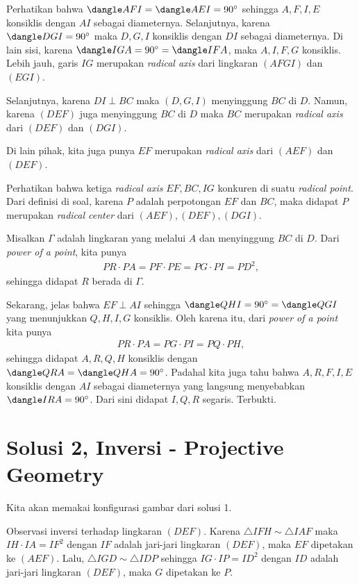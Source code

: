     Perhatikan bahwa $\dangle AFI = \dangle AEI = 90^\circ$ sehingga $A,F,I,E$ konsiklis dengan $AI$ sebagai diameternya. 
    Selanjutnya, karena $\dangle DGI = 90^\circ$ maka $D,G,I$ konsiklis dengan $DI$ sebagai diameternya. Di lain sisi, karena $\dangle IGA = 90^\circ = \dangle IFA$, maka $A,I,F,G$ konsiklis. 
    Lebih jauh, garis $IG$ merupakan \textit{radical axis} dari lingkaran $(AFGI)$ dan $(EGI)$.
    
    Selanjutnya, karena $DI \perp BC$ maka $(D,G,I)$ menyinggung $BC$ di $D$. Namun, karena $(DEF)$ juga menyinggung $BC$ di $D$ maka $BC$ merupakan \textit{radical axis} dari $(DEF)$ dan $(DGI)$.

    Di lain pihak, kita juga punya $EF$ merupakan \textit{radical axis} dari $(AEF)$ dan $(DEF)$.

    Perhatikan bahwa ketiga \textit{radical axis} $EF, BC, IG$ konkuren di suatu \textit{radical point}. Dari definisi di soal, karena $P$ adalah perpotongan $EF$ dan $BC$, maka didapat $P$ merupakan \textit{radical center} dari $(AEF), (DEF), (DGI)$.

    Misalkan $\Gamma$ adalah lingkaran yang melalui $A$ dan menyinggung $BC$ di $D$. Dari \textit{power of a point}, kita punya
    \begin{align*}
        PR \cdot PA = PF \cdot PE = PG \cdot PI = PD^2,
    \end{align*}
    sehingga didapat $R$ berada di $\Gamma$.

    Sekarang, jelas bahwa $EF \perp AI$ sehingga $\dangle QHI = 90^\circ = \dangle QGI$ yang menunjukkan $Q,H,I,G$ konsiklis. Oleh karena itu, dari \textit{power of a point} kita punya
    \begin{align*}
        PR \cdot PA = PG \cdot PI = PQ \cdot PH,
    \end{align*}
    sehingga didapat $A,R,Q,H$ konsiklis dengan $\dangle QRA = \dangle QHA = 90^\circ$. 
    Padahal kita juga tahu bahwa $A,R,F,I,E$ konsiklis dengan $AI$ sebagai diameternya yang langsung menyebabkan $\dangle IRA = 90^\circ$. Dari sini didapat $I,Q,R$ segaris. Terbukti.

\newpage
\section{Solusi 2, Inversi - Projective Geometry}
    Kita akan memakai konfigurasi gambar dari solusi 1.
        
    Observasi inversi terhadap lingkaran $(DEF)$. 
    Karena $\triangle IFH \sim \triangle IAF$ maka $IH \cdot IA = IF^2$ dengan $IF$ adalah jari-jari lingkaran $(DEF)$, maka $EF$ dipetakan ke $(AEF)$.
    Lalu, $\triangle IGD \sim \triangle IDP$ sehingga $IG \cdot IP = ID^2$ dengan $ID$ adalah jari-jari lingkaran $(DEF)$, maka $G$ dipetakan ke $P$.

